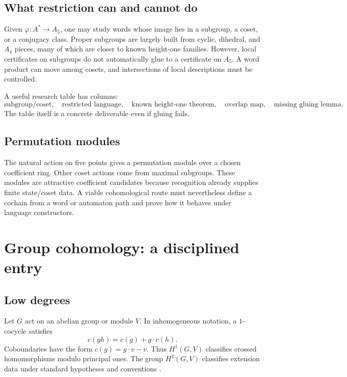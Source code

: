 \documentclass{amsart}
\begin{document}
\subsection{What restriction can and cannot do}

Given $\varphi:A^\ast\to A_5$, one may study words whose image lies in a subgroup, a coset, or a conjugacy class.  Proper subgroups are largely built from cyclic, dihedral, and $A_4$ pieces, many of which are closer to known height-one families.  However, local certificates on subgroups do not automatically glue to a certificate on $A_5$.  A word product can move among cosets, and intersections of local descriptions must be controlled.

A useful research table has columns:
\[
\text{subgroup/coset},\quad
\text{restricted language},\quad
\text{known height-one theorem},\quad
\text{overlap map},\quad
\text{missing gluing lemma}.
\]
The table itself is a concrete deliverable even if gluing fails.

\subsection{Permutation modules}

The natural action on five points gives a permutation module over a chosen coefficient ring.  Other coset actions come from maximal subgroups.  These modules are attractive coefficient candidates because recognition already supplies finite state/coset data.  A viable cohomological route must nevertheless define a cochain from a word or automaton path and prove how it behaves under language constructors.

\section{Group cohomology: a disciplined entry}

\subsection{Low degrees}

Let $G$ act on an abelian group or module $V$.  In inhomogeneous notation, a $1$-cocycle satisfies
\[
  c(gh)=c(g)+g\cdot c(h).
\]
Coboundaries have the form $c(g)=g\cdot v-v$.  Thus $H^1(G,V)$ classifies crossed homomorphisms modulo principal ones.  The group $H^2(G,V)$ classifies extension data under standard hypotheses and conventions \cite{brown1982cohomology,serre2002galois}.
\end{document}
